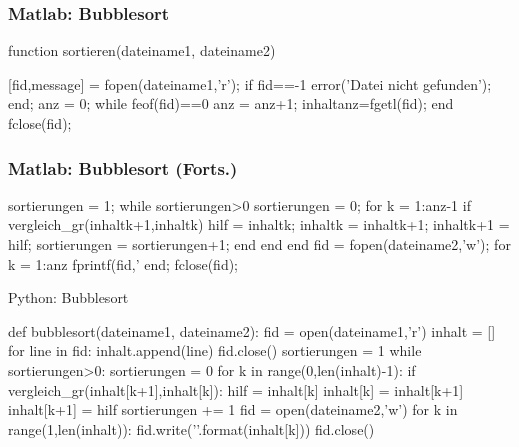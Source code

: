 \documentclass[hyperref={xetex}]{beamer}
\begin{document}
%
%
\begin{frame}[fragile]\frametitle{Matlab: Bubblesort}
\begin{matlabin}
function sortieren(dateiname1, dateiname2)
 
[fid,message] = fopen(dateiname1,'r');
if fid==-1 
    error('Datei nicht gefunden');
end;
anz = 0;
while feof(fid)==0
    anz = anz+1;     
    inhalt{anz}=fgetl(fid); 
end
fclose(fid);
\end{matlabin}
\end{frame}
%
%
\begin{frame}[fragile]\frametitle{Matlab: Bubblesort (Forts.)}
\begin{matlabin}
sortierungen = 1; 
while sortierungen>0
    sortierungen = 0;
    for k = 1:anz-1
        if vergleich_gr(inhalt{k+1},inhalt{k})
            hilf = inhalt{k}; inhalt{k} = inhalt{k+1}; 
            inhalt{k+1} = hilf;
            sortierungen = sortierungen+1;
        end
    end
end
fid = fopen(dateiname2,'w');
for k = 1:anz
   fprintf(fid,'%
end;
fclose(fid);
\end{matlabin}
\end{frame}

\begin{frame}[fragile]{Python: Bubblesort}
  \begin{pyin}
def bubblesort(dateiname1, dateiname2):
   fid = open(dateiname1,'r')
   inhalt = []
   for line in fid:
       inhalt.append(line)
   fid.close()
   sortierungen = 1
   while sortierungen>0:
       sortierungen = 0
       for k in range(0,len(inhalt)-1):
           if vergleich_gr(inhalt[k+1],inhalt[k]):
               hilf = inhalt[k]
               inhalt[k] = inhalt[k+1]
               inhalt[k+1] = hilf
               sortierungen += 1
   fid = open(dateiname2,'w')
   for k in range(1,len(inhalt)):
       fid.write('{}'.format(inhalt[k]))
   fid.close()    
  \end{pyin}
\end{frame}
\end{document}
